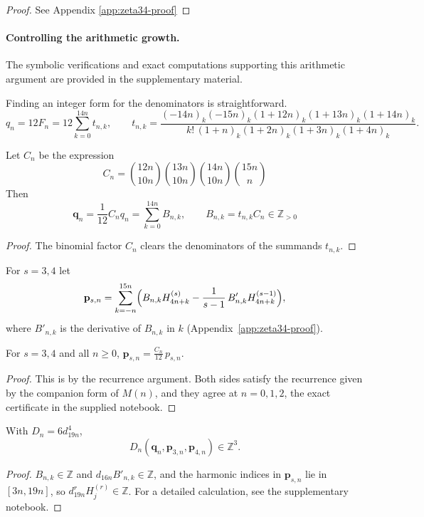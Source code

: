 \begin{proof}
See Appendix \ref{app:zeta34-proof}
\end{proof}
%
\paragraph{Controlling the arithmetic growth.}
\label{par: gcd z34}
The symbolic verifications and exact computations supporting this arithmetic argument are provided in the supplementary material.

Finding an integer form for the denominators is straightforward.
\[
q_n=12F_n = 12\sum_{k=0}^{14n}t_{n,k},\qquad  
t_{n,k}=\frac{(-14n)_k(-15n)_k(1+12n)_k(1+13n)_k(1+14n)_k}{k!\,(1+n)_k(1+2n)_k(1+3n)_k(1+4n)_k}.
\]
\begin{lemma}\label{prop:z34-q-iv}
Let $C_n$ be the expression
\[
C_n=\binom{12n}{10n}\binom{13n}{10n}
       \binom{14n}{10n}\binom{15n}{n}
\]
Then
\[
 \mathbf q_n=\frac{1}{12} C_nq_n
 =\sum_{k=0}^{14n}B_{n,k}, \qquad B_{n,k}=t_{n,k}C_{n}\in\mathbb Z_{>0}
\]
\end{lemma}
\begin{proof}
    The binomial factor $C_n$ clears the denominators of the summands $t_{n,k}$.
\end{proof}
For $s=3,4$ let
\begin{equation*}%
  \mathbf p_{s,n}=\sum_{k=-n}^{15n}
  \Bigl(B_{n,k}H^{(s)}_{4n+k}-\frac1{s-1}\,B'_{n,k}H^{(s-1)}_{4n+k}\Bigr),
\end{equation*}
where $B'_{n,k}$ is the derivative of $B_{n,k}$ in $k$
(Appendix~\ref{app:zeta34-proof}).

\begin{lemma}\label{prop:z34-p-iv}
For $s=3,4$ and all $n\ge0$, $\mathbf p_{s,n}=\frac{C_n}{12}\,p_{s,n}$.
\end{lemma}

\begin{proof}
This is by the recurrence argument. Both sides satisfy the recurrence given by the companion form of $M(n)$, and they agree at $n=0,1,2$, the exact certificate in the supplied notebook.
\end{proof}

\begin{lemma}\label{prop:z34-int} With $D_n=6d_{19n}^4$,
\[
D_n(\mathbf q_n,\mathbf p_{3,n},\mathbf p_{4,n})\in\mathbb Z^3.
\]
\end{lemma}
\begin{proof}
$B_{n,k}\in\mathbb Z$ and $d_{16n}B'_{n,k}\in\mathbb Z$, and the harmonic indices in $\mathbf p_{s,n}$ lie in $[3n,19n]$, so $d_{19n}^rH^{(r)}_j\in\mathbb Z$. For a detailed calculation, see the supplementary notebook.
\end{proof}

